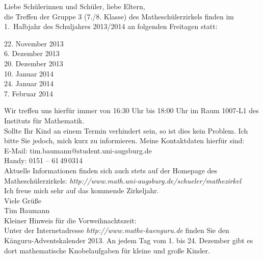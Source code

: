 \documentclass{infozettel}
\begin{document}
\renewcommand{\betreff}{Informationen zum Mathesch\"ulerzirkel der Universit\"at Augsburg\\ (7./8. Klasse -- Gruppe 3)}

\makeletterhead
Liebe Sch\"ulerinnen und Sch\"uler, liebe Eltern,\\[5pt]
die Treffen der Gruppe 3 (7./8. Klasse) des Mathesch\"ulerzirkels finden im 1.\ Halbjahr des Schuljahres 2013/2014 an folgenden Freitagen statt:
\begin{center}
22. November 2013\\
6. Dezember 2013\\
20. Dezember 2013\\
10. Januar 2014\\
24. Januar 2014\\
7. Februar 2014
\end{center}
Wir treffen uns hierf\"ur immer von 16:30 Uhr bis 18:00 Uhr im Raum 1007-L1 des Instituts f\"ur Mathematik.\\

Sollte Ihr Kind an 
einem Termin verhindert sein, so ist dies kein Problem. Ich bitte Sie jedoch, mich kurz zu informieren. Meine Kontaktdaten hierf\"ur sind:\\
E-Mail: tim.baumann@student.uni-augsburg.de\\
Handy: 0151 -- 61\,49\,0314\\

Aktuelle Informationen finden sich auch stets auf der Homepage des Mathesch\"ulerzirkels:
\textsl{http:/\!/www.math.uni-augsburg.de/schueler/mathezirkel}\\

Ich freue mich sehr auf das kommende Zirkeljahr.\\
Viele Gr\"u\ss{}e\\[1.5cm]
Tim Baumann\\[1.1cm]


\footnotesize
Kleiner Hinweis f\"ur die Vorweihnachtszeit:\\
Unter der Internetadresse \textsl{http:/\!/www.mathe-kaenguru.de} finden Sie den K\"anguru-Adventskalender 2013. An jedem Tag vom 1. bis 24. Dezember 
gibt es dort mathematische Knobelaufgaben f\"ur kleine und gro\ss{}e Kinder. 
\end{document}
